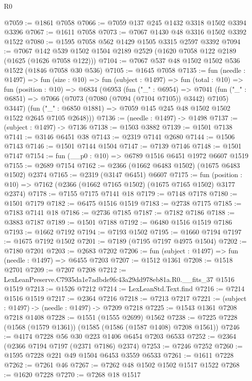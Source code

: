 \begin{lexlean}{R0}
\begin{coremodule}
@7059 := @1861 @7058
@7066 := @7059 @137 @245 @1432 @3318 @1502 @3394 @3396
@7067 := @1611 @7058
@7073 := @7067 @1430 @48 @3316 @1502 @3392 @1522
@7080 := @1595 @7058 @562 @1429 @1505 @3315 @2597 @3392
@7094 := @7067 @142 @539 @1502 @1504 @2189 @2529 (@1620 @7058 @122 @2189 (@1625 (@1626 @7058 @122)))
@7104 := @7067 @537 @48 @1502 @1502 @536 @1522 (@1846 @7058 @30 @536)
@7105 := @1645 @7058
@7135 := fun (needle : @1497) =>
  fun (size : @10) =>
  fun (subject : @1497) =>
  fun (total : @10) =>
  fun (position : @10) =>
  @6834
    (@6953
      (fun ("_" : @6954) =>
      @7041
        (fun ("_" : @6851) => @7066 (@7073 (@7080 (@7094 (@7104 @7105)) @3442) @7105) @3447)
        (fun ("_" : @6850 @1881) => @7059 @145 @245 @48 @1502 @1502 @1522 @2645 @7105 @2648)))
@7136 := (needle : @1497) -> @1498
@7137 := (subject : @1497) -> @7136
@7138 := @1503 @3882
@7139 := @1501 @7138
@7141 := @3146 @6451 @38
@7143 := @2319 @7141 @2680
@7144 := @1506 @7143
@7146 := @1501 @7144 @1504
@7147 := @7139 @7146
@7148 := @1501 @7147
@7154 := fun (__p0 : @10) => @6789 @1516 @6451 @1972 @6607 @1519
@7155 := @2689 @7154
@7162 := @2366 (@1662 @6483 @1502) (@1675 @6483 @1502) @2374
@7165 := @2319 (@3147 @6451) @6607
@7175 := fun (position : @10) => @7162 (@2366 (@1662 @7165 @1502) (@1675 @7165 @1502) @3177 @2374)
@7178 := @7155 @7175 @7141 @18
@7179 := @7148 @7178
@7180 := @1501 @7179
@7182 := @6475 @1516 @1519
@7183 := @2738 @7175
@7185 := @7183 @7141 @18
@7186 := @2736 @7185
@7187 := @7182 @7186
@7188 := @3883 @7187
@7189 := @1501 @7188
@7192 := @6480 @1516 @1519 @7186
@7193 := @1662 @7192
@7194 := @7193 @1502
@7195 := @1660 @7194
@7197 := @1675 @7192 @1502
@7201 := @7189 (@7195 @7197 @4975 @1504)
@7202 := @7180 @7201
@7203 := @2683 @7202
@7206 := fun (subject : @1497) => fun (needle : @1497) => @6455 @7203
@7207 := @1512 @1361
@7208 := @1518 @2701
@7209 := @7207 @7208
@7212 := LexLeanPreserve.C7935da1e7adbde9fc43a29dd978eb81a.R0.__fits_37 @1516 @1519
@7213 := @1526 @7212
@7214 := LexLeanStd.Text.find
@7216 := @7214 @1516 @1519
@7217 := @2364 @7216
@7218 := @7213 @7217
@7221 := (subject : @1497) -> (needle : @1497) -> @7209 @7218
@7225 := @1543 @1361 @7208 @7218 @1408
@7228 := @1551 (@1555 @2699) @1562
@7238 := @7225 @7228 (@1568 (@1579 @1361)) (@1585 (@1586 (@1587 @1408) @7208 @1561))
@7246 := @4174 @7228 @56 @30 @223 @1406 @6454 @7203 @6533
@7252 := @2364 (@2366 @7194 @7197 (@2371 @7186) @2374)
@7253 := @7246 @7252
@7260 := @1595 @7228 @221 @49 @1504 @6453 @3559 @6533
@7261 := @1611 @7228
@7262 := @7261 @46
@7267 := @7262 @48 @1502 @1502 @1517 @1522
@7268 := @1620 @7228
@7270 := @7268 @18 @1517

\end{coremodule}
\end{lexlean}
